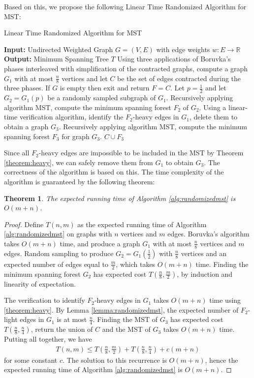 \documentclass[11pt]{article}
\theoremstyle{plain}
\newtheorem{theorem}{Theorem}[section]
\begin{document}
Based on this, we propose the following Linear Time Randomized Algorithm for MST\cite{karger1995randomized}:

\begin{algorithm}
    \caption{Linear Time Randomized Algorithm for MST}
    \begin{algorithmic}
    \label{alg:randomizedmst}
    \STATE \textbf{Input:} Undirected Weighted Graph $G=(V,E)$ with edge weights $w:E\to \mathbb{R}$
    \STATE \textbf{Output:} Minimum Spanning Tree $T$
    \STATE Using three applications of Boruvka's phases interleaved with simplification of the contracted graphs, compute a graph $G_1$ with at most $\frac{n}{8}$ vertices and let $C$ be the set of edges contracted during the three phases. If $G$ is empty then exit and return $F=C$.
    \STATE Let $p=\frac{1}{2}$ and let $G_2=G_1(p)$ be a randomly sampled subgraph of $G_1$.
    \STATE Recursively applying algorithm MST, compute the minimum spanning forest $F_2$ of $G_2$.
    \STATE Using a linear-time verification algorithm, identify the $F_2$-heavy edges in $G_1$, delete them to obtain a graph $G_3$.
    \STATE Recursively applying algorithm MST, compute the minimum spanning forest $F_3$ for graph $G_3$.
    \RETURN $C\cup F_3$
    \end{algorithmic}
\end{algorithm}

Since all $F_2$-heavy edges are impossible to be included in the MST by Theorem \ref{theorem:heavy}, we can safely remove them from $G_1$ to obtain $G_3$. The correctness of the algorithm is based on this. The time complexity of the algorithm is guaranteed by the following theorem:

\begin{theorem}
    The expected running time of Algorithm \ref{alg:randomizedmst} is $O(m+n)$.
\end{theorem}
\begin{proof}
    Define $T(n,m)$ as the expected running time of Algorithm \ref{alg:randomizedmst} on graphs with $n$ vertices and $m$ edges. Boruvka's algorithm takes $O(m+n)$ time, and produce a graph $G_1$ with at most $\frac{n}{8}$ vertices and $m$ edges. Random sampling to produce $G_2=G_1(\frac{1}{2})$ with $\frac{n}{8}$ vertices and an expected number of edges equal to $\frac{m}{2}$, which takes $O(m+n)$ time. Finding the minimum spanning forest $G_2$ has expected cost $T(\frac{n}{8},\frac{m}{2})$, by induction and linearity of expectation.

    The verification to identify $F_2$-heavy edges in $G_1$ takes $O(m+n)$ time using \ref{theorem:heavy}. By Lemma \ref{lemma:randomizedmst}, the expected number of $F_2$-light edges in $G_1$ is at most $\frac{n}{4}$. Finding the MST of $G_3$ has expected cost $T(\frac{n}{8},\frac{n}{4})$, return the union of $C$ and the MST of $G_3$ takes $O(m+n)$ time. Putting all together, we have
    \begin{align*}
        T\left(n,m\right)\leq T\left(\frac{n}{8},\frac{m}{2}\right)+T\left(\frac{n}{8},\frac{n}{4}\right)+c\left(m+n\right)
    \end{align*}
    for some constant $c$. The solution to this recurrence is $O(m+n)$, hence the expected running time of Algorithm \ref{alg:randomizedmst} is $O(m+n)$.
\end{proof}
\end{document}

